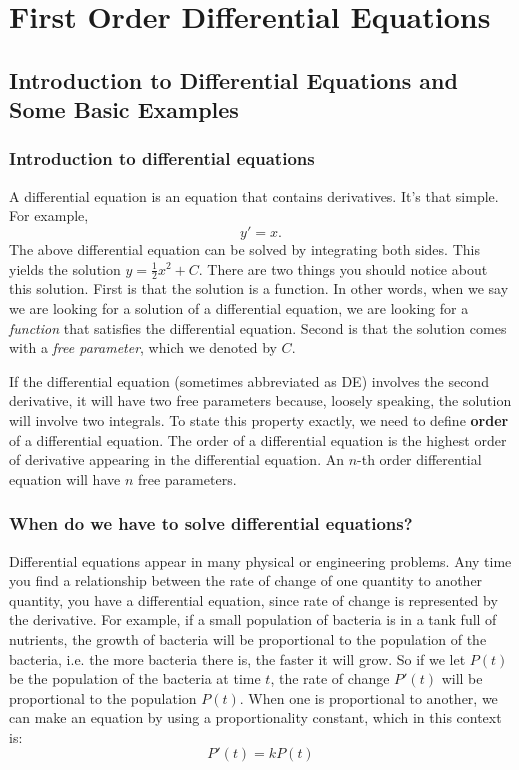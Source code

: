 \documentclass[12pt]{report}
\begin{document}
	
	\chapter{First Order Differential Equations}
	\section{Introduction to Differential Equations and Some Basic Examples}
	
	\subsection*{Introduction to differential equations}

A differential equation  is an equation that contains derivatives. It's that simple. For example,
$$y'=x.$$
The above differential equation can be solved by integrating both sides. This yields the solution $y=\frac{1}{2} x^2 + C$. There are two things you should notice about this solution. First is that the solution is a function. In other words, when we say we are looking for a solution of a differential equation, we are looking for a \textit{function} that satisfies the differential equation. Second is that the solution comes with a \textit{free parameter}, which we denoted by $C$. 

If the differential equation (sometimes abbreviated as DE) involves the second derivative, it will have two free parameters because, loosely speaking, the solution will involve two integrals. To state this property exactly, we need to define \textbf{order} of a differential equation. The order of a differential equation is the highest order of derivative appearing in the differential equation. An $n$-th order differential equation will have $n$ free parameters. 

  \subsection*{When do we have to solve differential equations?}

Differential equations appear in many physical or engineering problems. Any time you find a relationship between the rate of change of one quantity to another quantity, you have a differential equation, since rate of change is represented by the derivative. For example, if a small population of bacteria is in a tank full of nutrients, the growth of bacteria will be proportional to the population of the bacteria, i.e. the more bacteria there is, the faster it will grow. So if we let $P(t)$ be the population of the bacteria at time $t$, the rate of change $P'(t)$ will be proportional to the population $P(t)$. When one is proportional to another, we can make an equation by using a proportionality constant, which in this context is:
$$P'(t)=k P(t)$$
\end{document}
